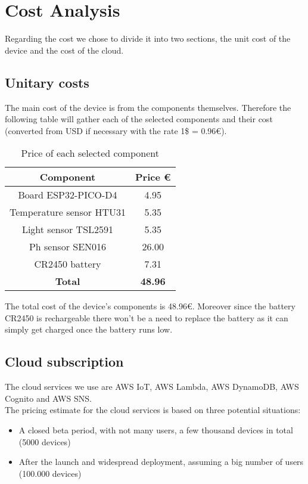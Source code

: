 \section{Cost Analysis}
Regarding the cost we chose to divide it into two sections, the unit cost of the device and the cost of the cloud.

\subsection{Unitary costs}
The main cost of the device is from the components themselves. Therefore the following
table will gather each of the selected components and their cost (converted from USD
if necessary with the rate 1\$ = 0.96€).\\

\begin{table}[htbp]
    \centering
    \begin{tabular}{|c|c|}
        \hline
        \textbf{Component} & \textbf{Price €} \\
        \hline
         Board ESP32-PICO-D4 & 4.95 \\
         Temperature sensor HTU31 & 5.35 \\
         Light sensor TSL2591 & 5.35 \\
         Ph sensor SEN016 & 26.00 \\
         CR2450 battery & 7.31 \\
         \hline
         \textbf{Total} & \textbf{48.96}\\
         \hline
    \end{tabular}
    \caption{Price of each selected component}
    \label{tab:my_label}
\end{table}

The total cost of the device's components is 48.96€. Moreover since the battery CR2450
is rechargeable there won't be a need to replace the battery as it can simply get
charged once the battery runs low.

\subsection{Cloud subscription}
The cloud services we use are AWS IoT, AWS Lambda, AWS DynamoDB, AWS Cognito and AWS
SNS. \\
The pricing estimate for the cloud services is based on three potential situations:
\begin{itemize}
    \item A closed beta period, with not many users, a few thousand devices in
          total (5000 devices)
    \item After the launch and widespread deployment, assuming a big number of users
          (100.000 devices)
\end{itemize}

